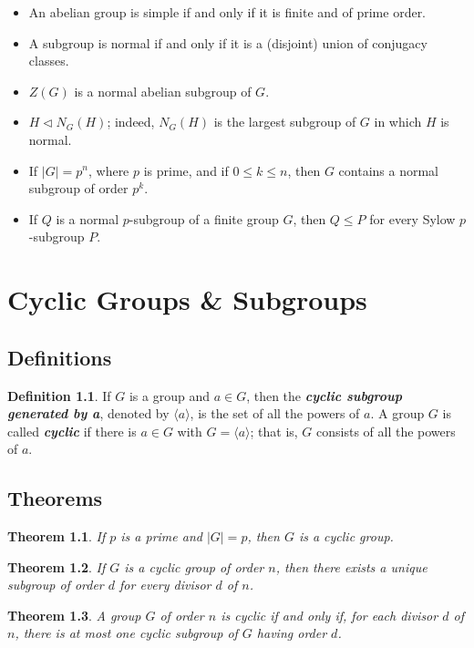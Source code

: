 \documentclass[12pt]{report}
\newtheorem{theorem}{Theorem}[chapter]
\theoremstyle{definition}
\newtheorem*{definition}{Definition}
\newcommand{\term}[1]{\textbf{\textit{#1}}}
\newcommand{\gen}[1]{{\langle}#1{\rangle}}
\begin{document}
\begin{itemize}
	\item An abelian group is simple if and only if it is finite and of prime order.
	\item A subgroup is normal if and only if it is a (disjoint) union of conjugacy classes.
	\item $Z(G)$ is a normal abelian subgroup of $G$.
	\item $H\vartriangleleft N_G(H)$; indeed, $N_G(H)$ is the largest subgroup of $G$ in which $H$ is normal.
	\item If $|G|=p^n$, where $p$ is prime, and if $0\le k\le n$, then $G$ contains a normal subgroup of order $p^k$.
	\item If $Q$ is a normal $p$-subgroup of a finite group $G$, then $Q\le P$ for every Sylow $p$-subgroup $P$.
\end{itemize}


\chapter{Cyclic Groups \& Subgroups}
\section{Definitions}
\begin{definition}
	If $G$ is a group and $a\in G$, then the \term{cyclic subgroup generated by a}, denoted by $\gen{a}$, is the set of all the powers of $a$.
	A group $G$ is called \term{cyclic} if there is $a\in G$ with $G=\gen{a}$; that is, $G$ consists of all the powers of $a$.
\end{definition}


\section{Theorems}

\begin{theorem}
	If $p$ is a prime and $|G|=p$, then $G$ is a cyclic group.
\end{theorem}

\begin{theorem}
	If $G$ is a cyclic group of order $n$, then there exists a unique subgroup of order $d$ for every divisor $d$ of $n$.
\end{theorem}

\begin{theorem}
	A group $G$ of order $n$ is cyclic if and only if, for each divisor $d$ of $n$, there is at most one cyclic subgroup of $G$ having order $d$.
\end{theorem}
\end{document}
